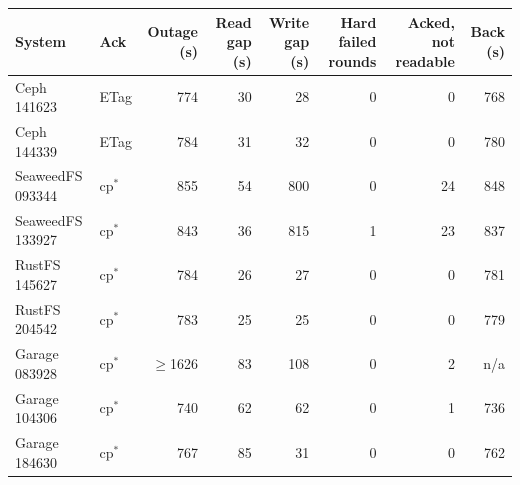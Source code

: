 \begin{tabular}{llrrrrrr}
\toprule
System & Ack & Outage (s) & Read gap (s) & Write gap (s) & Hard failed rounds & Acked, not readable & Back (s) \\
\midrule
Ceph 141623 & ETag & 774 & 30 & 28 & 0 & 0 & 768 \\
Ceph 144339 & ETag & 784 & 31 & 32 & 0 & 0 & 780 \\
\midrule
SeaweedFS 093344 & cp$^{*}$ & 855 & 54 & 800 & 0 & 24 & 848 \\
SeaweedFS 133927 & cp$^{*}$ & 843 & 36 & 815 & 1 & 23 & 837 \\
\midrule
RustFS 145627 & cp$^{*}$ & 784 & 26 & 27 & 0 & 0 & 781 \\
RustFS 204542 & cp$^{*}$ & 783 & 25 & 25 & 0 & 0 & 779 \\
\midrule
Garage 083928 & cp$^{*}$ & $\geq$1626 & 83 & 108 & 0 & 2 & n/a \\
Garage 104306 & cp$^{*}$ & 740 & 62 & 62 & 0 & 1 & 736 \\
Garage 184630 & cp$^{*}$ & 767 & 85 & 31 & 0 & 0 & 762 \\
\bottomrule
\end{tabular}
